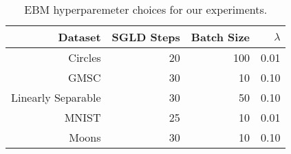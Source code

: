 \begin{table}

\caption{EBM hyperparemeter choices for our experiments. \label{tab:ebmparams} \newline}
\centering
\fontsize{8}{10}\selectfont
\begin{tabular}[t]{rrrr}
\toprule
Dataset & SGLD Steps & Batch Size & $\lambda$\\
\midrule
Circles & 20 & 100 & 0.01\\
GMSC & 30 & 10 & 0.10\\
Linearly Separable & 30 & 50 & 0.10\\
MNIST & 25 & 10 & 0.01\\
Moons & 30 & 10 & 0.10\\
\bottomrule
\end{tabular}
\end{table}
